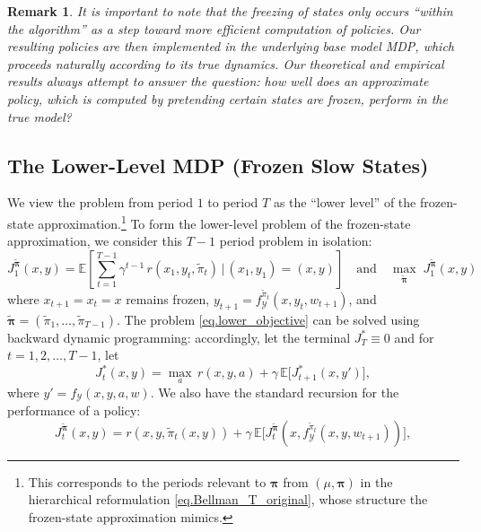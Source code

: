 \documentclass[11pt, notitlepage]{article}
\newcommand{\E}{\mathbb{E}}
\newcommand{\1}{\mathbbm{1}}
\newtheorem{remark}{Remark}
\begin{document}
\begin{remark}
It is important to note that the freezing of states only occurs ``within the algorithm'' as a step toward more efficient computation of policies. Our resulting policies are then implemented in the underlying base model MDP, which proceeds naturally according to its true dynamics. Our theoretical and empirical results always attempt to answer the question: how well does an approximate policy, which is computed by pretending certain states are frozen, perform in the true model?
\label{rem:pretend}
\end{remark}


\subsection{The Lower-Level MDP (Frozen Slow States)} 
\label{sec:lowerlevel}
We view the problem from period $1$ to period $T$ as the ``lower level'' of the frozen-state approximation.\footnote{This corresponds to the periods relevant to $\boldsymbol{\pi}$ from $(\mu, \boldsymbol{\pi})$ in the hierarchical reformulation \eqref{eq.Bellman_T_original}, whose structure the frozen-state approximation mimics.}
To form the lower-level problem of the frozen-state approximation, we consider this $T-1$ period problem in isolation:
\begin{equation}
J_1^{\tilde{\boldsymbol{\pi}}}(x, y) = \E \left[ \sum_{t=1}^{T-1} \gamma^{t-1} \, r(x_1, y_t, \tilde{\pi}_t) \,\Bigr| \, (x_1, y_1) = (x,y) \right] \quad \text{and} \quad \max_{\tilde{\boldsymbol{\pi}}} \; J_1^{\tilde{\boldsymbol{\pi}}}(x, y)
\label{eq.lower_objective}
\end{equation}
where $x_{t+1} = x_t = x$ remains frozen, $y_{t+1} = f^{\tilde{\pi}_t}_\mathcal{Y}(x, y_t, w_{t+1})$,
and $\tilde{\boldsymbol{\pi}} = (\tilde{\pi}_1, \ldots, \tilde{\pi}_{T-1})$. The problem \eqref{eq.lower_objective} can be solved using backward dynamic programming: accordingly, let the terminal $J^*_T \equiv 0$ and for $t=1,2,\ldots,T-1$, let
\begin{equation} \label{eq.Vlower}
    J^*_t(x,y) = \max_{a} \,  r(x,y,a) + \gamma \, \E \bigl[ J^*_{t+1}(x,y') \bigr],
\end{equation}
where $y' = f_\mathcal{Y}(x,y,a,w)$. We also have the standard recursion for the performance of a policy: \begin{equation}
    J^{\tilde{\boldsymbol{\pi}}}_t(x,y) = r(x,y,\tilde{\pi}_t(x,y)) + \gamma \, \E \bigl[ J^{\tilde{\boldsymbol{\pi}}}_{t}(x,f^{\tilde{\pi}_t}_\mathcal{Y}(x, y, w_{t+1})) \bigr],
    \label{eq.bellmaneval}
\end{equation}
\end{document}
